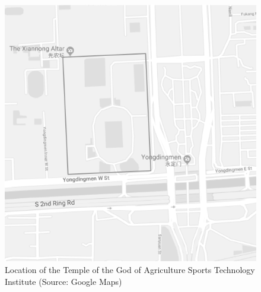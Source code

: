 \begin{figure}[htbp]
  \includegraphics[width = \linewidth]{images/beijingXNT.png}
  \caption{Location of the Temple of the God of Agriculture Sports Technology Institute  (Source: Google Maps)}
  \label{fig:beijingXNT}
\end{figure}


